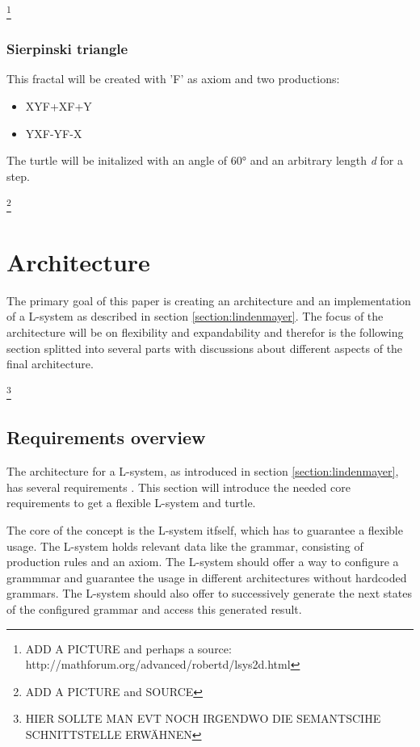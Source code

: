 \documentclass[english]{cpp-hmwk}
\begin{document}
\footnote{ADD A PICTURE and perhaps a source: http://mathforum.org/advanced/robertd/lsys2d.html}

\subsubsection{Sierpinski triangle}
This fractal will be created with 'F' as axiom and two productions:

\begin{itemize}
\item X\rightarrow YF+XF+Y
\item Y\rightarrow XF-YF-X
\end{itemize}

\noindent The turtle will be initalized with an angle of 60° and an arbitrary length \textit{d} for a step.
 
\footnote{ADD A PICTURE and SOURCE}


\pagebreak
\section{Architecture}
The primary goal of this paper is creating an architecture and an implementation of a L-system as described in section \ref{section:lindenmayer}. The focus of the architecture will be on flexibility and expandability and therefor is the following section splitted into several parts with discussions about different aspects of the final architecture.

\footnote{HIER SOLLTE MAN EVT NOCH IRGENDWO DIE SEMANTSCIHE SCHNITTSTELLE ERWÄHNEN}

\subsection{Requirements overview}
The architecture for a L-system, as introduced in section \ref{section:lindenmayer}, has several requirements . This section will introduce the needed core requirements to get a flexible L-system and turtle.

\medskip
\noindent The core of the concept is the L-system itfself, which has to guarantee a flexible usage. The L-system holds relevant data like the grammar, consisting of production rules and an axiom. The L-system should offer a way to configure a grammmar and guarantee the usage in different architectures without hardcoded grammars. The L-system should also offer to successively generate the next states of the configured grammar and access this generated result.
\end{document}
